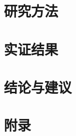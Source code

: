 \documentclass[UTF8,a4paper,zihao=-4]{ctexart}
\newif\ifanonymous \anonymoustrue
\begin{document}
\section{研究方法}
\section{实证结果}
\section{结论与建议}

% 

\clearpage
\section*{附录}

\ifanonymous\else
\clearpage
\section*{致谢}
\addcontentsline{toc}{section}{致谢}
\fi
\end{document}
